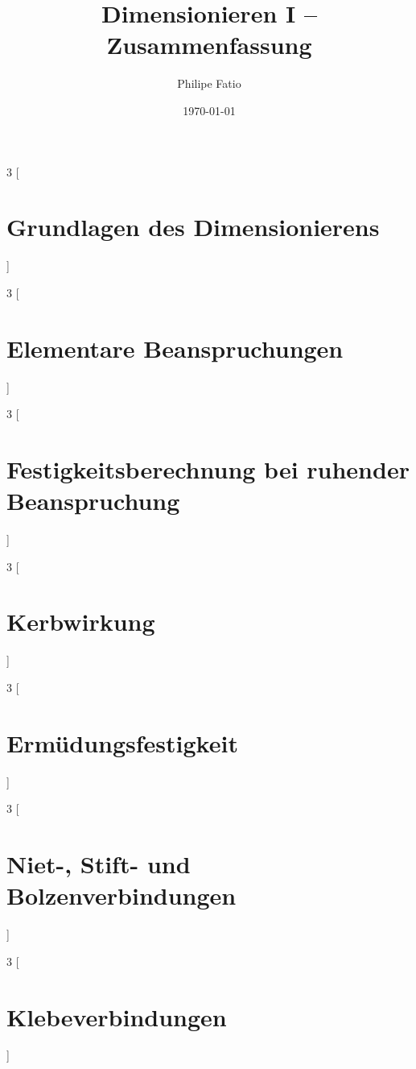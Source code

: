 \documentclass[9pt,fleqn,article,ngerman]{memoir}
\title{Dimensionieren I -- Zusammenfassung}
\date{\today}
\author{Philipe Fatio}
\numberwithin{equation}{section}
\begin{document}
\begin{multicols*}{3}
	[\chapter{Grundlagen des Dimensionierens}] %
\end{multicols*}
\begin{multicols*}{3}
	[\chapter{Elementare Beanspruchungen}] %
\end{multicols*}
\begin{multicols*}{3}
	[\chapter{Festigkeitsberechnung bei ruhender Beanspruchung}] %
\end{multicols*}
\begin{multicols*}{3}
	[\chapter{Kerbwirkung}] %
\end{multicols*}
\begin{multicols*}{3}
	[\chapter{Ermüdungsfestigkeit}] %
\end{multicols*}
\begin{multicols*}{3}
	[\chapter{Niet-, Stift- und Bolzenverbindungen}] %
\end{multicols*}
\begin{multicols*}{3}
	[\chapter{Klebeverbindungen}] %
\end{multicols*}
\end{document}
